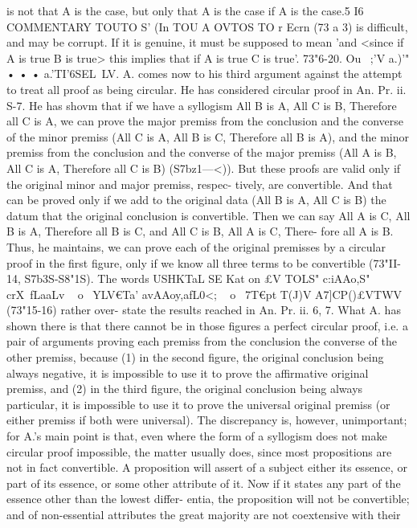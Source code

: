 {{{{{{{is not that A is the case, but only that A is the case if A is the
case.5 I6
COMMENTARY
TOUTO S' (In TOU A OVTOS TO
r
Ecrn (73 a 3) is difficult, and may be
corrupt. If it is genuine, it must be supposed to mean 'and <since
if A is true B is true> this implies that if A is true C is true'.
73"6-20. Ou ~;'V a.)'}" • • • a.'TI'6SEL~LV. A. comes now to his
third argument against the attempt to treat all proof as being
circular. He has considered circular proof in An. Pr. ii. S-7. He
has shovm that if we have a syllogism All B is A, All C is B,
Therefore all C is A, we can prove the major premiss from the
conclusion and the converse of the minor premiss (All C is A,
All B is C, Therefore all B is A), and the minor premiss from the
conclusion and the converse of the major premiss (All A is B,
All C is A, Therefore all C is B) (S7bz1---<)). But these proofs
are valid only if the original minor and major premiss, respec-
tively, are convertible. And that can be proved only if we add
to the original data (All B is A, All C is B) the datum that the
original conclusion is convertible. Then we can say All A is C,
All B is A, Therefore all B is C, and All C is B, All A is C, There-
fore all A is B. Thus, he maintains, we can prove each of the
original premisses by a circular proof in the first figure, only if
we know all three terms to be convertible (73"II-14, S7b3S-S8"1S).
The words USHKTaL SE Kat on £V TOLS" c:iAAo,S" crX~fLaaLv ~ o~
YLV€Ta' avAAoy,afL0<; ~ o~ 7T€pt T(J)V A7]CP()£VTWV (73"15-16) rather over-
state the results reached in An. Pr. ii. 6, 7. What A. has shown
there is that there cannot be in those figures a perfect circular
proof, i.e. a pair of arguments proving each premiss from the
conclusion
the converse of the other premiss, because (1) in
the second figure, the original conclusion being always negative,
it is impossible to use it to prove the affirmative original premiss,
and (2) in the third figure, the original conclusion being always
particular, it is impossible to use it to prove the universal original
premiss (or either premiss if both were universal). The discrepancy
is, however, unimportant; for A.'s main point is that, even where
the form of a syllogism does not make circular proof impossible,
the matter usually does, since most propositions are not in fact
convertible. A proposition will assert of a subject either its
essence, or part of its essence, or some other attribute of it. Now
if it states any part of the essence other than the lowest differ-
entia, the proposition will not be convertible; and of non-essential
attributes the great majority are not coextensive with their
}}}}}}
